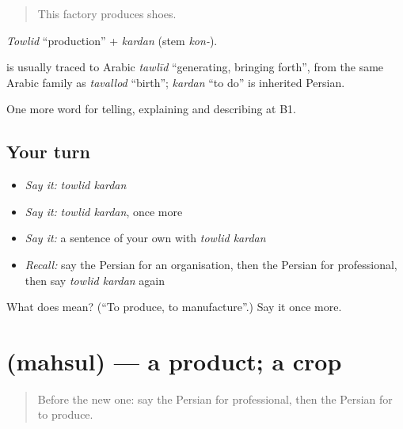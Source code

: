 \begin{quote}
This factory produces shoes.
\end{quote}

\emph{Towlid} \textquotedblleft{}production\textquotedblright{} + \emph{kardan} (stem \emph{kon-}).

\begin{cousinweb}
\textbf{} is usually traced to Arabic \emph{tawlīd} \textquotedblleft{}generating, bringing forth\textquotedblright{}, from the same Arabic family as \emph{tavallod} \textquotedblleft{}birth\textquotedblright{}; \emph{kardan} \textquotedblleft{}to do\textquotedblright{} is inherited Persian.
\end{cousinweb}

\begin{grammarlens}[title={What you've built}]
One more word for telling, explaining and describing at B1.
\end{grammarlens}

\subsection*{Your turn}
\begin{itemize}
\raggedright
  \item \emph{Say it:} \emph{towlid kardan}
  \item \emph{Say it:} \emph{towlid kardan}, once more
  \item \emph{Say it:} a sentence of your own with \emph{towlid kardan}
  \item \emph{Recall:} say the Persian for an organisation, then the Persian for professional, then say \emph{towlid kardan} again
\end{itemize}

\begin{tcolorbox}[breakable,colback=teal!4,colframe=teal!35!black,title={Before you move on}]
What does   mean? (\textquotedblleft{}To produce, to manufacture\textquotedblright{}.) Say it once more.
\end{tcolorbox}
\section[\texorpdfstring{\fa{محصول} (mahsul)}{محصول (mahsul)}]{ (mahsul) — a product; a crop}

\label{lesson:FA-C383-mahsul}



\begin{quote}
Before the new one: say the Persian for professional, then the Persian for to produce.
\end{quote}

